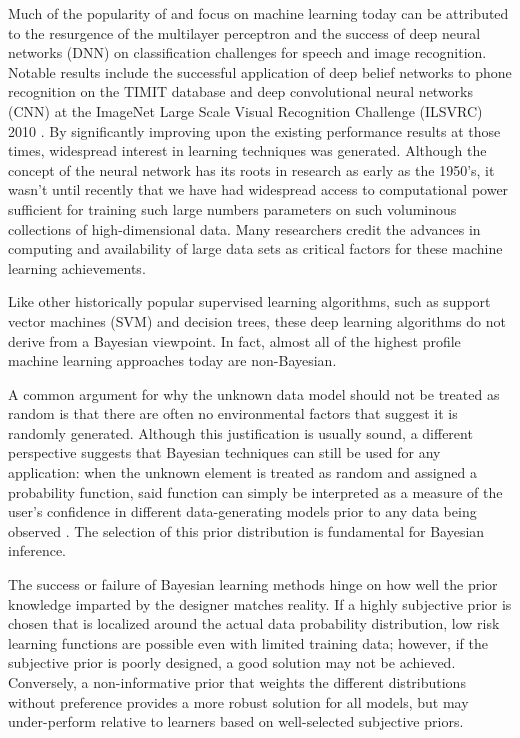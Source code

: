 \documentclass[12pt]{article}
\begin{document}
Much of the popularity of and focus on machine learning today can be attributed to the resurgence of the multilayer perceptron and the success of deep neural networks (DNN) on classification challenges for speech and image recognition. Notable results include the successful application of deep belief networks to phone recognition on the TIMIT database \cite{mohamed} and deep convolutional neural networks (CNN) at the ImageNet Large Scale Visual Recognition Challenge (ILSVRC) 2010 \cite{krizhevsky}. By significantly improving upon the existing performance results at those times, widespread interest in learning techniques was generated. Although the concept of the neural network has its roots in research as early as the 1950's, it wasn't until recently that we have had widespread access to computational power sufficient for training such large numbers parameters on such voluminous collections of high-dimensional data. Many researchers credit the advances in computing and availability of large data sets as critical factors for these machine learning achievements.


Like other historically popular supervised learning algorithms, such as support vector machines (SVM) and decision trees, these deep learning algorithms do not derive from a Bayesian viewpoint. In fact, almost all of the highest profile machine learning approaches today are non-Bayesian. 


A common argument for why the unknown data model should not be treated as random is that there are often no environmental factors that suggest it is randomly generated. Although this justification is usually sound, a different perspective suggests that Bayesian techniques can still be used for any application: when the unknown element is treated as random and assigned a probability function, said function can simply be interpreted as a measure of the user's confidence in different data-generating models prior to any data being observed \cite{box}. The selection of this prior distribution is fundamental for Bayesian inference.

The success or failure of Bayesian learning methods hinge on how well the prior knowledge imparted by the designer matches reality. If a highly subjective prior \cite{box} is chosen that is localized around the actual data probability distribution, low risk learning functions are possible even with limited training data; however, if the subjective prior is poorly designed, a good solution may not be achieved. Conversely, a non-informative prior that weights the different distributions without preference provides a more robust solution for all models, but may under-perform relative to learners based on well-selected subjective priors.
\end{document}
